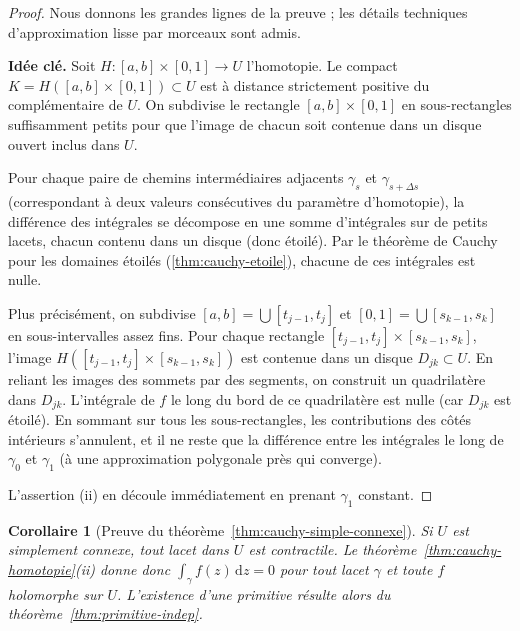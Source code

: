 \documentclass[12pt,a4paper,openany]{book}
\theoremstyle{definition}
\theoremstyle{plain}
\newtheorem{corollaire}[definition]{Corollaire}
\theoremstyle{remark}
\newcommand{\dd}{\mathrm{d}}
\begin{document}
\begin{proof}
Nous donnons les grandes lignes de la preuve ; les détails techniques
d'approximation lisse par morceaux sont admis.

\medskip

\noindent\textbf{Idée clé.}
Soit $H \colon [a,b] \times [0,1] \to U$ l'homotopie. Le compact
$K = H([a,b] \times [0,1]) \subset U$ est à distance strictement positive du
complémentaire de $U$. On subdivise le rectangle $[a,b] \times [0,1]$ en sous-rectangles
suffisamment petits pour que l'image de chacun soit contenue dans un disque
ouvert inclus dans $U$.

Pour chaque paire de chemins intermédiaires adjacents $\gamma_s$ et
$\gamma_{s+\Delta s}$ (correspondant à deux valeurs consécutives du paramètre
d'homotopie), la différence des intégrales se décompose en une somme
d'intégrales sur de petits lacets, chacun contenu dans un disque (donc étoilé).
Par le théorème de Cauchy pour les domaines étoilés
(\ref{thm:cauchy-etoile}), chacune de ces intégrales est nulle.

Plus précisément, on subdivise $[a,b] = \bigcup [t_{j-1}, t_j]$ et
$[0,1] = \bigcup [s_{k-1}, s_k]$ en sous-intervalles assez fins. Pour
chaque rectangle $[t_{j-1}, t_j] \times [s_{k-1}, s_k]$, l'image
$H([t_{j-1}, t_j] \times [s_{k-1}, s_k])$ est contenue dans un disque
$D_{jk} \subset U$. En reliant les images des sommets par des segments, on
construit un quadrilatère dans $D_{jk}$. L'intégrale de $f$ le long du bord
de ce quadrilatère est nulle (car $D_{jk}$ est étoilé). En sommant sur tous
les sous-rectangles, les contributions des côtés intérieurs s'annulent, et il
ne reste que la différence entre les intégrales le long de $\gamma_0$ et
$\gamma_1$ (à une approximation polygonale près qui converge).

L'assertion (ii) en découle immédiatement en prenant $\gamma_1$ constant.
\end{proof}

\begin{corollaire}[Preuve du théorème~\ref{thm:cauchy-simple-connexe}]\label{cor:preuve-cauchy-sc}
Si $U$ est simplement connexe, tout lacet dans $U$ est contractile. Le
théorème~\ref{thm:cauchy-homotopie}(ii) donne donc
$\int_\gamma f(z)\,\dd z = 0$ pour tout lacet $\gamma$ et toute $f$
holomorphe sur $U$. L'existence d'une primitive résulte alors du
théorème~\ref{thm:primitive-indep}.
\end{corollaire}

\end{document}
